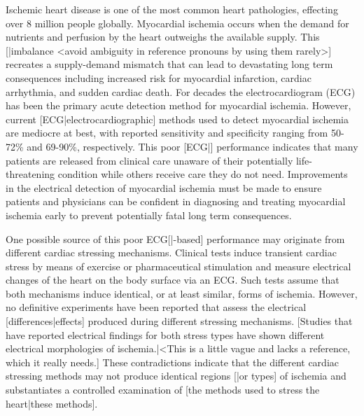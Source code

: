 \documentclass[twocolumn]{cinc}
\begin{document}

Ischemic heart disease is one of the most common heart pathologies,
effecting over 8 million people globally. \cite{Roth2015} Myocardial
ischemia occurs when the demand for nutrients and perfusion by the heart
outweighs the available supply. This [|imbalance <avoid ambiguity in
reference pronouns by using them rarely>] recreates a supply-demand
mismatch that can lead to devastating long term consequences including
increased risk for myocardial infarction, cardiac arrhythmia, and sudden
cardiac death.\cite{Roth2015} For decades the electrocardiogram (ECG) has
been the primary acute detection method for myocardial
ischemia. \cite{McCarthy1990} However, current [ECG|electrocardiographic]
methods used to detect myocardial ischemia are mediocre at best, with
reported sensitivity and specificity ranging from 50-72\% and 69-90\%,
respectively. \cite{Akkerhuis2011} This poor [ECG|] performance indicates
that many patients are released from clinical care unaware of their
potentially life-threatening condition while others receive care they do
not need. Improvements in the electrical detection of myocardial ischemia
must be made to ensure patients and physicians can be confident in
diagnosing and treating myocardial ischemia early to prevent potentially
fatal long term consequences.

One possible source of this poor ECG[|-based] performance may originate
from different cardiac stressing mechanisms. Clinical tests induce
transient cardiac stress by means of exercise or pharmaceutical stimulation
and measure electrical changes of the heart on the body surface via an
ECG. Such tests assume that both mechanisms induce identical, or at least
similar, forms of ischemia. However, no definitive experiments have been
reported that assess the electrical [differences|effects] produced during
different stressing mechanisms. [Studies that have reported electrical
findings for both stress types have shown different electrical morphologies
of ischemia.|<This is a little vague and lacks a reference, which it really
needs.] These contradictions indicate that the different cardiac stressing
methods may not produce identical regions [|or types] of ischemia and
substantiates a controlled examination of [the methods used to stress the
heart|these methods].
\end{document}
